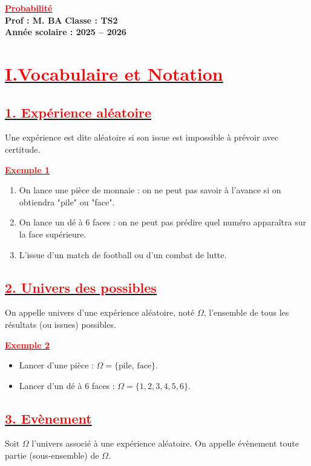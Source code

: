 \documentclass[12pt,a4paper]{article}
\begin{document}
\begin{center}
    \Large\textbf{\underline{\textcolor{red}{Probabilité}}}\\[-0.1cm]
    \normalsize\textbf{Prof : M. BA} \hfill \textbf{Classe : TS2}\\[-0.1cm]
    \textbf{Année scolaire : 2025 -- 2026}
\end{center}

\section*{\underline{\textbf{\textcolor{red}{I.Vocabulaire et Notation}}}}
\subsection*{\underline{\textbf{\textcolor{red}{1. Expérience aléatoire}}}}
Une expérience est dite aléatoire si son issue est impossible à prévoir avec certitude.

\underline{\textbf{\textcolor{red}{Exemple 1}}}
\begin{enumerate}
    \item On lance une pièce de monnaie : on ne peut pas savoir à l'avance si on obtiendra "pile" ou "face".
    \item On lance un dé à 6 faces : on ne peut pas prédire quel numéro apparaîtra sur la face supérieure.
    \item L'issue d'un match de football ou d'un combat de lutte.
\end{enumerate}

\subsection*{\underline{\textbf{\textcolor{red}{2. Univers des possibles}}}}

On appelle univers d’une expérience aléatoire, noté $\Omega$, l’ensemble de tous les résultats (ou issues) possibles.

\underline{\textbf{\textcolor{red}{Exemple 2}}}
\begin{itemize}
    \item Lancer d'une pièce : $\Omega = \{ \text{pile, face} \}$.
    \item Lancer d'un dé à 6 faces : $\Omega = \{1, 2, 3, 4, 5, 6\}$.
\end{itemize}

\subsection*{\underline{\textbf{\textcolor{red}{3. Evènement}}}}
Soit $\Omega$ l’univers associé à une expérience aléatoire. On appelle évènement toute partie (sous-ensemble) de $\Omega$.
\end{document}
